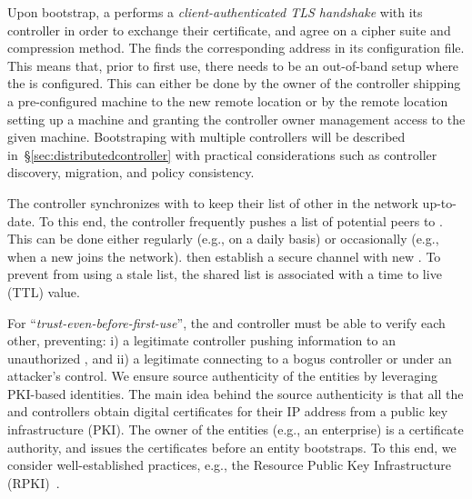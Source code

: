 Upon bootstrap, a \tp performs a \textit{client-authenticated TLS handshake} with its 
controller in order to exchange their certificate, and agree on a cipher suite and compression
method. The \tp finds the corresponding address in its configuration file. This means 
that, prior to first use, there needs to be an out-of-band setup where the \tp is 
configured. This can either be done by the owner of the controller shipping a pre-configured 
machine to the new remote location or by the remote location setting up a machine and 
granting the controller owner management access to the given machine. Bootstraping \tps 
with multiple controllers will be described in~\S\ref{sec:distributedcontroller} with
practical considerations such as controller discovery, \tp migration, and policy consistency.

The controller synchronizes with \tps to keep their list of other \tps in the network 
up-to-date. To this end, the controller frequently pushes a list of potential peers to \tps.
This can be done either regularly (e.g., on a daily basis) or occasionally
(e.g., when a new \tp joins the network).
\tps then establish a secure channel with new \tps. To prevent \tps from using a stale \tp list,
the shared \tp list is associated with a time to live (TTL) value. 

For ``\textit{trust-even-before-first-use}'', 
the \tps and controller must be able to verify each 
other, preventing: i) a legitimate controller pushing information to an unauthorized \tp, 
and ii) a legitimate \tp connecting to a bogus controller or \tp under an attacker's control.
We ensure source authenticity of the \name entities by leveraging PKI-based identities.
The main idea behind the source authenticity is that all the \tps and controllers obtain
digital certificates for their IP address from a public key infrastructure (PKI). The owner 
of the entities (e.g., an enterprise) is a certificate authority, and issues the certificates
before an entity bootstraps. To this end, we consider well-established practices, e.g.,
the Resource Public Key Infrastructure (RPKI)~\cite{rfc7115,rfc6810}.


